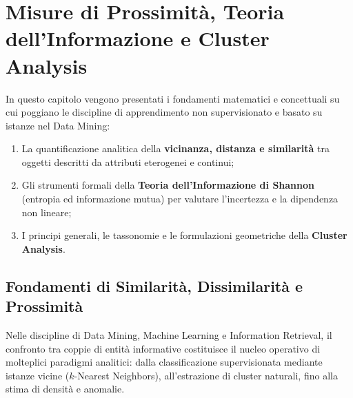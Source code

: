 \chapter{Misure di Prossimità, Teoria dell'Informazione e Cluster Analysis}
\label{chap:dm-similarity-clustering-foundations}

In questo capitolo vengono presentati i fondamenti matematici e concettuali su cui poggiano le discipline di apprendimento non supervisionato e basato su istanze nel Data Mining:
\begin{enumerate}[noitemsep]
    \item La quantificazione analitica della \textbf{vicinanza, distanza e similarità} tra oggetti descritti da attributi eterogenei e continui;
    \item Gli strumenti formali della \textbf{Teoria dell'Informazione di Shannon} (entropia ed informazione mutua) per valutare l'incertezza e la dipendenza non lineare;
    \item I principi generali, le tassonomie e le formulazioni geometriche della \textbf{Cluster Analysis}.
\end{enumerate}

\section{Fondamenti di Similarità, Dissimilarità e Prossimità}
\label{sec:dm-foundations-proximity}

Nelle discipline di Data Mining, Machine Learning e Information Retrieval, il confronto tra coppie di entità informative costituisce il nucleo operativo di molteplici paradigmi analitici: dalla classificazione supervisionata mediante istanze vicine ($k$-Nearest Neighbors), all'estrazione di cluster naturali, fino alla stima di densità e anomalie.

